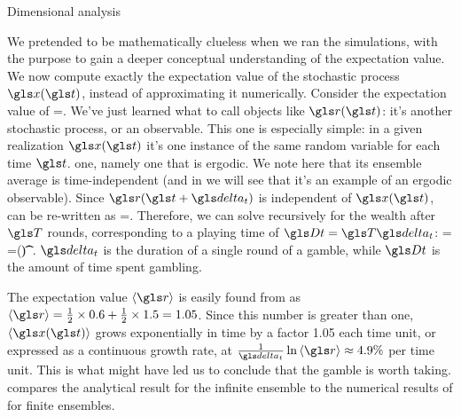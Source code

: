 \begin{excursion}{Dimensional analysis}
%
\end{excursion}

We pretended to be mathematically clueless when we ran the simulations,
with the purpose to gain a deeper conceptual understanding of the expectation 
value. We now compute exactly the expectation value of the stochastic process $\x(\t)$, instead of 
approximating it numerically. Consider the expectation value of   
\be
\ave{\x(\t+\dt)}=\ave{\x(\t)\gr(\t+\dt)}.
\ee
We've just learned what to call objects like $\gr(\t)$: it's another stochastic process, or an observable. This one is  especially simple: in a given realization $\x(\t)$ it's one instance of the same random variable for each time $\t$.  one, namely one that is ergodic. We note here that its ensemble average is time-independent (and in  we will see that it's an example of an ergodic observable).
Since $\gr(\t+\dt)$ is independent of $\x(\t)$,  can be re-written as
\be
\ave{\x(\t+\dt)}=\ave{\x(\t)}\ave{\gr}.
\ee
Therefore, we can solve recursively for the wealth after $\T$ rounds, corresponding to a playing time of $\Dt=\T\dt$:
\be
\ave{\x(\t+\Dt)} = \ave{\x(\t+\T\dt)}=\x(\t)\ave{\gr}^\T.
\ee
$\dt$ is the duration of a single round of a gamble, while $\Dt$ is the amount of time spent gambling.

The expectation value $\ave{\gr}$ is easily found from  
as $\ave{\gr}=\frac{1}{2}\times 0.6 + \frac{1}{2}\times 1.5=1.05$. Since 
this number is greater than one, $\ave{\x(\t)}$ grows exponentially in 
time by a factor 1.05 each time unit, or expressed as a continuous 
growth rate, at $\frac{1}{\dt}\ln \ave{\gr}\approx4.9\%$ per time 
unit. This is what might have led us to
conclude that the gamble is worth taking.  compares the
analytical result for the infinite ensemble to the numerical results 
of  for finite ensembles.


